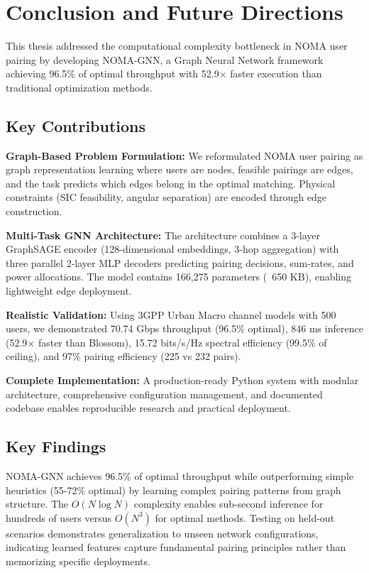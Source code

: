 \chapter{Conclusion and Future Directions}
\label{chap:conclusion}

This thesis addressed the computational complexity bottleneck in NOMA user pairing by developing NOMA-GNN, a Graph Neural Network framework achieving 96.5\% of optimal throughput with 52.9× faster execution than traditional optimization methods.

\section{Key Contributions}

\textbf{Graph-Based Problem Formulation:} We reformulated NOMA user pairing as graph representation learning where users are nodes, feasible pairings are edges, and the task predicts which edges belong in the optimal matching. Physical constraints (SIC feasibility, angular separation) are encoded through edge construction.

\textbf{Multi-Task GNN Architecture:} The architecture combines a 3-layer GraphSAGE encoder (128-dimensional embeddings, 3-hop aggregation) with three parallel 2-layer MLP decoders predicting pairing decisions, sum-rates, and power allocations. The model contains 166,275 parameters (~650 KB), enabling lightweight edge deployment.

\textbf{Realistic Validation:} Using 3GPP Urban Macro channel models with 500 users, we demonstrated 70.74 Gbps throughput (96.5\% optimal), 846 ms inference (52.9× faster than Blossom), 15.72 bits/s/Hz spectral efficiency (99.5\% of ceiling), and 97\% pairing efficiency (225 vs 232 pairs).

\textbf{Complete Implementation:} A production-ready Python system with modular architecture, comprehensive configuration management, and documented codebase enables reproducible research and practical deployment.

\section{Key Findings}

NOMA-GNN achieves 96.5\% of optimal throughput while outperforming simple heuristics (55-72\% optimal) by learning complex pairing patterns from graph structure. The $O(N \log N)$ complexity enables sub-second inference for hundreds of users versus $O(N^3)$ for optimal methods. Testing on held-out scenarios demonstrates generalization to unseen network configurations, indicating learned features capture fundamental pairing principles rather than memorizing specific deployments.

